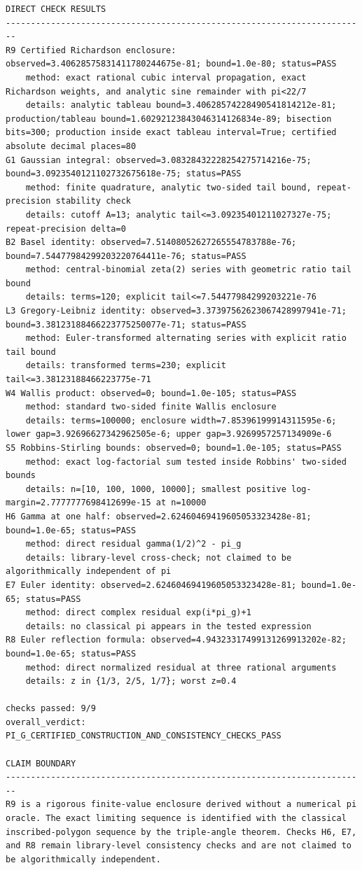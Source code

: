 \documentclass[11pt]{article}
\begin{document}
\begin{lstlisting}[style=outputstyle,caption={Canonical Version 3.0 output}]
DIRECT CHECK RESULTS
------------------------------------------------------------------------
R9 Certified Richardson enclosure: observed=3.40628575831411780244675e-81; bound=1.0e-80; status=PASS
    method: exact rational cubic interval propagation, exact Richardson weights, and analytic sine remainder with pi<22/7
    details: analytic tableau bound=3.40628574228490541814212e-81; production/tableau bound=1.60292123843046314126834e-89; bisection bits=300; production inside exact tableau interval=True; certified absolute decimal places=80
G1 Gaussian integral: observed=3.08328432228254275714216e-75; bound=3.0923540121102732675618e-75; status=PASS
    method: finite quadrature, analytic two-sided tail bound, repeat-precision stability check
    details: cutoff A=13; analytic tail<=3.09235401211027327e-75; repeat-precision delta=0
B2 Basel identity: observed=7.51408052627265554783788e-76; bound=7.54477984299203220764411e-76; status=PASS
    method: central-binomial zeta(2) series with geometric ratio tail bound
    details: terms=120; explicit tail<=7.54477984299203221e-76
L3 Gregory-Leibniz identity: observed=3.37397562623067428997941e-71; bound=3.38123188466223775250077e-71; status=PASS
    method: Euler-transformed alternating series with explicit ratio tail bound
    details: transformed terms=230; explicit tail<=3.38123188466223775e-71
W4 Wallis product: observed=0; bound=1.0e-105; status=PASS
    method: standard two-sided finite Wallis enclosure
    details: terms=100000; enclosure width=7.85396199914311595e-6; lower gap=3.92696627342962505e-6; upper gap=3.9269957257134909e-6
S5 Robbins-Stirling bounds: observed=0; bound=1.0e-105; status=PASS
    method: exact log-factorial sum tested inside Robbins' two-sided bounds
    details: n=[10, 100, 1000, 10000]; smallest positive log-margin=2.7777777698412699e-15 at n=10000
H6 Gamma at one half: observed=2.62460469419605053323428e-81; bound=1.0e-65; status=PASS
    method: direct residual gamma(1/2)^2 - pi_g
    details: library-level cross-check; not claimed to be algorithmically independent of pi
E7 Euler identity: observed=2.62460469419605053323428e-81; bound=1.0e-65; status=PASS
    method: direct complex residual exp(i*pi_g)+1
    details: no classical pi appears in the tested expression
R8 Euler reflection formula: observed=4.94323317499131269913202e-82; bound=1.0e-65; status=PASS
    method: direct normalized residual at three rational arguments
    details: z in {1/3, 2/5, 1/7}; worst z=0.4

checks passed: 9/9
overall_verdict: PI_G_CERTIFIED_CONSTRUCTION_AND_CONSISTENCY_CHECKS_PASS

CLAIM BOUNDARY
------------------------------------------------------------------------
R9 is a rigorous finite-value enclosure derived without a numerical pi oracle. The exact limiting sequence is identified with the classical inscribed-polygon sequence by the triple-angle theorem. Checks H6, E7, and R8 remain library-level consistency checks and are not claimed to be algorithmically independent.
\end{lstlisting}
\end{document}

